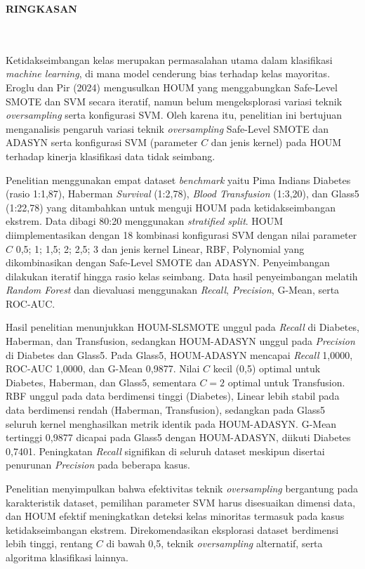 \clearpage
{}%
\thispagestyle{fancy}

\begin{center}
	\large \bfseries \MakeUppercase{Ringkasan}\\
	\normalsize \normalfont {\thetitle}\\
	\normalsize \normalfont {\theauthor}\\
	\bigskip
	
	\normalsize \normalfont \justifying
	\normalsize \normalfont \justifying
Ketidakseimbangan kelas merupakan permasalahan utama dalam klasifikasi \textit{machine learning}, di mana model cenderung bias terhadap kelas mayoritas. Eroglu dan Pir (2024) mengusulkan HOUM yang menggabungkan Safe-Level SMOTE dan SVM secara iteratif, namun belum mengeksplorasi variasi teknik \textit{oversampling} serta konfigurasi SVM. Oleh karena itu, penelitian ini bertujuan menganalisis pengaruh variasi teknik \textit{oversampling} Safe-Level SMOTE dan ADASYN serta konfigurasi SVM (parameter $C$ dan jenis kernel) pada HOUM terhadap kinerja klasifikasi data tidak seimbang.

Penelitian menggunakan empat dataset \textit{benchmark} yaitu Pima Indians Diabetes (rasio 1:1,87), Haberman \textit{Survival} (1:2,78), \textit{Blood Transfusion} (1:3,20), dan Glass5 (1:22,78) yang ditambahkan untuk menguji HOUM pada ketidakseimbangan ekstrem. Data dibagi 80:20 menggunakan \textit{stratified split}. HOUM diimplementasikan dengan 18 kombinasi konfigurasi SVM dengan nilai parameter $C$ 0,5; 1; 1,5; 2; 2,5; 3 dan jenis kernel Linear, RBF, Polynomial yang dikombinasikan dengan Safe-Level SMOTE dan ADASYN. Penyeimbangan dilakukan iteratif hingga rasio kelas seimbang. Data hasil penyeimbangan melatih \textit{Random Forest} dan dievaluasi menggunakan \textit{Recall}, \textit{Precision}, G-Mean, serta ROC-AUC.

Hasil penelitian menunjukkan HOUM-SLSMOTE unggul pada \textit{Recall} di Diabetes, Haberman, dan Transfusion, sedangkan HOUM-ADASYN unggul pada \textit{Precision} di Diabetes dan Glass5. Pada Glass5, HOUM-ADASYN mencapai \textit{Recall} 1,0000, ROC-AUC 1,0000, dan G-Mean 0,9877. Nilai $C$ kecil (0,5) optimal untuk Diabetes, Haberman, dan Glass5, sementara $C=2$ optimal untuk Transfusion. RBF unggul pada data berdimensi tinggi (Diabetes), Linear lebih stabil pada data berdimensi rendah (Haberman, Transfusion), sedangkan pada Glass5 seluruh kernel menghasilkan metrik identik pada HOUM-ADASYN. G-Mean tertinggi 0,9877 dicapai pada Glass5 dengan HOUM-ADASYN, diikuti Diabetes 0,7401. Peningkatan \textit{Recall} signifikan di seluruh dataset meskipun disertai penurunan \textit{Precision} pada beberapa kasus.

Penelitian menyimpulkan bahwa efektivitas teknik \textit{oversampling} bergantung pada karakteristik dataset, pemilihan parameter SVM harus disesuaikan dimensi data, dan HOUM efektif meningkatkan deteksi kelas minoritas termasuk pada kasus ketidakseimbangan ekstrem. Direkomendasikan eksplorasi dataset berdimensi lebih tinggi, rentang $C$ di bawah 0,5, teknik \textit{oversampling} alternatif, serta algoritma klasifikasi lainnya.

\vfill

\end{center}
\clearpage
\null
\thispagestyle{empty}
\newpage
\clearpage